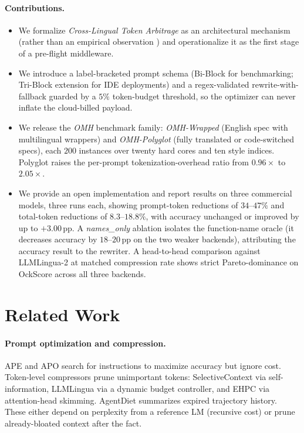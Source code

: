 \documentclass[11pt,a4paper,twocolumn]{article}
\begin{document}
\paragraph{Contributions.}
\begin{itemize}
    \item We formalize \textit{Cross-Lingual Token Arbitrage} as an architectural mechanism (rather than an empirical observation \cite{ahuja2025efficientxlang}) and operationalize it as the first stage of a pre-flight middleware.
    \item We introduce a label-bracketed prompt schema (Bi-Block for benchmarking; Tri-Block extension for IDE deployments) and a regex-validated rewrite-with-fallback guarded by a $5\%$ token-budget threshold, so the optimizer can never inflate the cloud-billed payload.
    \item We release the \textit{OMH} benchmark family: \textit{OMH-Wrapped} (English spec with multilingual wrappers) and \textit{OMH-Polyglot} (fully translated or code-switched specs), each $200$ instances over twenty hard cores and ten style indices. Polyglot raises the per-prompt tokenization-overhead ratio from $0.96\times$ to $2.05\times$.
    \item We provide an open implementation and report results on three commercial models, three runs each, showing prompt-token reductions of $34$--$47\%$ and total-token reductions of $8.3$--$18.8\%$, with accuracy unchanged or improved by up to $+3.00$\,pp. A \textit{names\_only} ablation isolates the function-name oracle (it decreases accuracy by $18$--$20$\,pp on the two weaker backends), attributing the accuracy result to the rewriter. A head-to-head comparison against LLMLingua-2 \cite{pan2024llmlingua2} at matched compression rate shows strict Pareto-dominance on OckScore across all three backends.
\end{itemize}

\section{Related Work}
\label{sec:related}

\paragraph{Prompt optimization and compression.} APE \cite{zhou2023large} and APO \cite{pryzant-etal-2023-automatic} search for instructions to maximize accuracy but ignore cost. Token-level compressors prune unimportant tokens: SelectiveContext \cite{li-etal-2023-compressing} via self-information, LLMLingua \cite{jiang-etal-2023-llmlingua} via a dynamic budget controller, and EHPC \cite{fei2025efficient} via attention-head skimming. AgentDiet \cite{xiao2026reducing} summarizes expired trajectory history. These either depend on perplexity from a reference LM (recursive cost) or prune already-bloated context after the fact.
\end{document}
